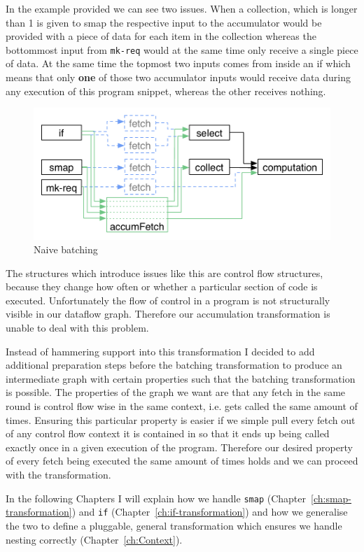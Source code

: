 In the example provided we can see two issues.
When a collection, which is longer than 1 is given to smap the respective input to the accumulator would be provided with a piece of data for each item in the collection whereas the bottommost input from \texttt{mk-req} would at the same time only receive a single piece of data.
At the same time the topmost two inputs comes from inside an if which means that only \textbf{one} of those two accumulator inputs would receive data during any execution of this program snippet, whereas the other receives nothing.

\begin{figure}
    \includegraphics[width=\textwidth]{../Figures/naive-transformation}
	\caption{Naive batching}
	\label{fig:naive-batching-context-problem}
\end{figure}

The structures which introduce issues like this are control flow structures, because they change how often or whether a particular section of code is executed.
Unfortunately the flow of control in a program is not structurally visible in our dataflow graph.
Therefore our accumulation transformation is unable to deal with this problem.

Instead of hammering support into this transformation I decided to add additional preparation steps before the batching transformation to produce an intermediate graph with certain properties such that the batching transformation is possible.
The properties of the graph we want are that any fetch in the same round is control flow wise in the same context, i.e. gets called the same amount of times.
Ensuring this particular property is easier if we simple pull every fetch out of any control flow context it is contained in so that it ends up being called exactly once in a given execution of the program.
Therefore our desired property of every fetch being executed the same amount of times holds and we can proceed with the transformation.

In the following Chapters I will explain how we handle \texttt{smap} (Chapter~\ref{ch:smap-transformation}) and \texttt{if} (Chapter~\ref{ch:if-transformation}) and how we generalise the two to define a pluggable, general transformation which ensures we handle nesting correctly (Chapter~\ref{ch:Context}).


